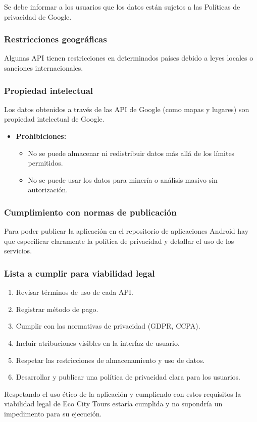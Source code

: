 Se debe informar a los usuarios que los datos están sujetos a las Políticas de privacidad de Google.

\subsubsection{Restricciones geográficas}

Algunas API tienen restricciones en determinados países debido a leyes locales o sanciones internacionales. 


\subsubsection{Propiedad intelectual}

Los datos obtenidos a través de las API de Google (como mapas y lugares) son propiedad intelectual de Google.


\begin{itemize}
	\item \textbf{Prohibiciones:}
	\begin{itemize}
		\item No se puede almacenar ni redistribuir datos más allá de los límites permitidos.
		\item No se puede usar los datos para minería o análisis masivo sin autorización.
	\end{itemize}
\end{itemize}

\subsubsection{Cumplimiento con normas de publicación}

Para poder publicar la aplicación en el repositorio de aplicaciones Android hay que especificar claramente la política de privacidad y detallar el uso de los servicios.


\subsubsection{Lista a cumplir para viabilidad legal}

\begin{enumerate}
	\item Revisar términos de uso de cada API.
	\item Registrar método de pago.
	\item Cumplir con las normativas de privacidad (GDPR, CCPA).
	\item Incluir atribuciones visibles en la interfaz de usuario.
	\item Respetar las restricciones de almacenamiento y uso de datos.
	\item Desarrollar y publicar una política de privacidad clara para los usuarios.
\end{enumerate}

Respetando el uso ético de la aplicación y cumpliendo con estos requisitos la viabilidad legal de Eco City Tours estaría cumplida y no supondría un impedimento para su ejecución.